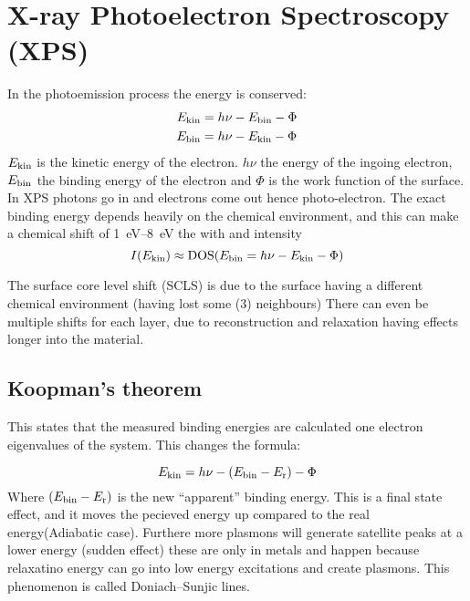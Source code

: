 \documentclass[article,oneside]{memoir}
\begin{document}
\chapter{X-ray Photoelectron Spectroscopy (XPS)}

In the photoemission process the energy is conserved:
\begin{align*}
        E_{\textup{kin}}&=h\nu -E_{\textup{bin}} -\Phi\\
        E_{\textup{bin}}&=h\nu - E_{\textup{kin}} -\Phi
\end{align*}
$E_{\textup{kin}}$ is the kinetic energy of the electron. $h\nu$ the energy of the ingoing electron, $E_{\textup{bin}}$ the binding energy of the electron and $\Phi$ is the work function of the surface.
In XPS photons go in and electrons come out hence photo-electron. The exact binding energy depends heavily on the chemical environment, and this can make a chemical shift of \SIrange{1}{8}{\eV} the with and intensity 
$$I(E_{\textup{kin}})\approx\textup{DOS}(E_{\textup{bin}}=h\nu-E_{\textup{kin}}-\Phi)$$

The surface core level shift (SCLS) is due to the surface having a different chemical environment (having lost some (3) neighbours) There can even be multiple shifts for each layer, due to reconstruction and relaxation having effects longer into the material.

\section{Koopman's theorem}
This states that the measured binding energies are calculated one electron eigenvalues of the system. This changes the formula:


\begin{equation*}
        E_{\textup{kin}}=h\nu-(E_{\textup{bin}}-E_{\textup{r}})-\Phi
\end{equation*}
Where $(E_{\textup{bin}}-E_{\textup{r}})$ is the new ``apparent'' binding energy.
This is a final state effect, and it moves the pecieved energy up compared to the real energy(Adiabatic case). Furthere more plasmons will generate satellite peaks at a lower energy (sudden effect) these are only in metals and happen because relaxatino energy can go into low energy excitations and create plasmons. This phenomenon is called Doniach--Sunjic lines.
\end{document}
